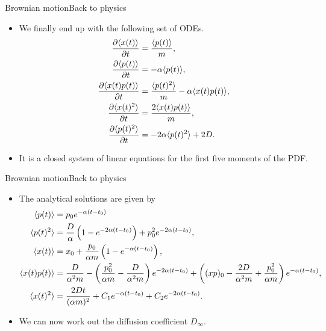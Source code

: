 \documentclass[usenames,dvipsnames,svgnames,10pt,aspectratio=169]{beamer}
\begin{document}
\begin{frame}[t, c]{Brownian motion}{Back to physics}
	\begin{itemize}
		\item We finally end up with the following set of ODEs.
		\begin{equation}
			\begin{aligned}
				\frac{\partial \langle x(t) \rangle}{\partial t} & = \frac{\langle p(t) \rangle}{m}, \\
				\frac{\partial \langle p(t) \rangle}{\partial t} & = -\alpha \langle p(t) \rangle, \\
				\frac{\partial \langle x(t) p(t) \rangle}{\partial t} & = \frac{\langle p(t)^2 \rangle}{m} - \alpha \langle x(t) p(t) \rangle, \\
				\frac{\partial \langle x(t)^2 \rangle}{\partial t} & = \frac{2\langle x(t) p(t) \rangle}{m}, \\
				\frac{\partial \langle p(t)^2 \rangle}{\partial t} & = -2\alpha \langle p(t)^2 \rangle + 2D.
			\end{aligned}
			\notag
		\end{equation}

		\item It is a closed system of linear equations for the first five moments of the PDF.
	\end{itemize}

	\vspace{1cm}
\end{frame}

\begin{frame}[t, c]{Brownian motion}{Back to physics}
	\begin{itemize}
		\item The analytical solutions are given by
		\begin{equation}
			\begin{aligned}
				\langle p(t) \rangle & = p_0 e^{-\alpha(t-t_0)} \\
				\langle p(t)^2 \rangle & = \frac{D}{\alpha} \left( 1 - e^{-2\alpha(t-t_0)} \right) + p_0^2 e^{-2\alpha(t-t_0)}, \\
				\langle x(t) \rangle & = x_0 + \frac{p_0}{\alpha m} \left( 1 - e^{-\alpha(t-t_0)} \right), \\
				\langle x(t) p(t) \rangle & = \frac{D}{\alpha^2m} - \left( \frac{p_0^2}{\alpha m} - \frac{D}{\alpha^2 m} \right) e^{-2\alpha(t-t_0)} + \left( (xp)_0 - \frac{2D}{\alpha^2m} + \frac{p_0^2}{\alpha m} \right) e^{-\alpha(t-t_0)},\\
				\langle x(t)^2 \rangle & = \frac{2Dt}{(\alpha m)^2} + C_1 e^{-\alpha (t-t_0)} + C_2 e^{-2\alpha(t-t_0)}.
			\end{aligned}
			\notag
		\end{equation}

		\item We can now work out the diffusion coefficient $D_{\infty}$.
	\end{itemize}

	\vspace{1cm}
\end{frame}
\end{document}
